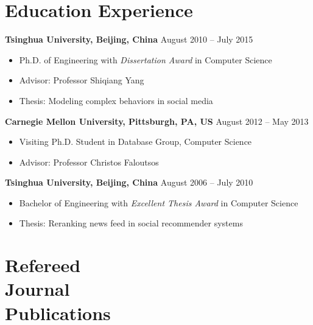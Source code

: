 \documentclass[margin, 10pt]{res}
\begin{document}
\begin{resume}
\section{Education Experience}

\textbf{Tsinghua University, Beijing, China} \hfill{August 2010 -- July 2015}
\begin{itemize} \itemsep -2pt
\item Ph.D. of Engineering with \textit{Dissertation Award} in Computer Science
\item Advisor: Professor Shiqiang Yang
\item Thesis: Modeling complex behaviors in social media
\end{itemize}

\textbf{Carnegie Mellon University, Pittsburgh, PA, US} \hfill{August 2012 -- May 2013}
\begin{itemize} \itemsep -2pt
\item Visiting Ph.D. Student in Database Group, Computer Science
\item Advisor: Professor Christos Faloutsos
\end{itemize}

\textbf{Tsinghua University, Beijing, China} \hfill{August 2006 -- July 2010}
\begin{itemize} \itemsep -2pt
\item Bachelor of Engineering with \textit{Excellent Thesis Award} in Computer Science
\item Thesis: Reranking news feed in social recommender systems
\end{itemize}


\section{Refereed \\ Journal \\ Publications}


\end{resume}
\end{document}

